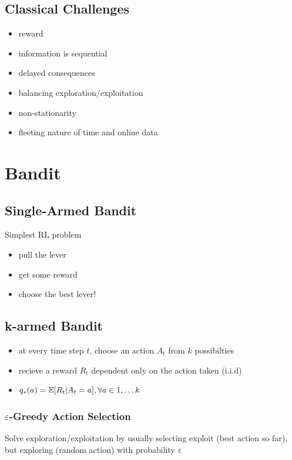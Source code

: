 \documentclass[]{article}
\theoremstyle{definition}
\newcommand{\E}{\mathbb{E}}
\begin{document}
\subsection{Classical Challenges}
\label{sub:classical_challenges}
\begin{itemize}
    \item reward
    \item information is sequential
    \item delayed consequences
    \item balancing exploration/exploitation
    \item non-stationarity
    \item fleeting nature of time and online data
\end{itemize}


\section{Bandit}
\label{sec:bandit}

\subsection{Single-Armed Bandit}
\label{ssub:single_armed_bandit}
Simplest RL problem
\begin{itemize}
    \item pull the lever
    \item get some reward
    \item choose the best lever!
\end{itemize}

\subsection{k-armed Bandit}
\label{ssub:k_armed_bandit}
\begin{itemize}
    \item at every time step $t$, choose an action $A_t$ from $k$ possibilties
    \item recieve a reward $R_t$ dependent only on the action taken (i.i.d)
    \item $q_*(a) = \E [R_t | A_t = a], \medskip \forall a \in {1, \ldots k }$
\end{itemize}

\subsubsection{$\varepsilon$-Greedy Action Selection}
\label{ssub:explot}
Solve exploration/exploitation by usually selecting exploit (best action so far), but exploring (random action) with probability $\varepsilon$
\end{document}
